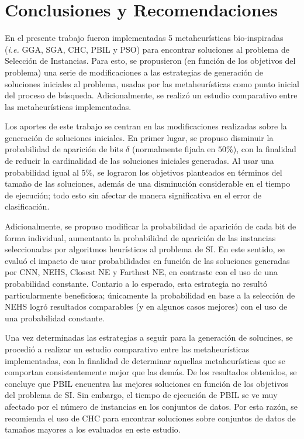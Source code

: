 \chapter*{Conclusiones y Recomendaciones}
\label{conclusiones}

En el presente trabajo fueron implementadas 5 metaheurísticas bio-inspiradas (\emph{i.e.} GGA, SGA, CHC, PBIL y PSO) para encontrar soluciones al problema de Selección de Instancias. Para esto, se propusieron (en función de los objetivos del problema) una serie de modificaciones a las estrategias de generación de soluciones iniciales al problema, usadas por las metaheurísticas como punto inicial del proceso de búsqueda. Adicionalmente, se realizó un estudio comparativo entre las metaheurísticas implementadas.%

Los aportes de este trabajo se centran en las modificaciones realizadas sobre la generación de soluciones iniciales. En primer lugar, se propuso disminuir la probabilidad de aparición de bits $\delta$ (normalmente fijada en $50\%$), con la finalidad de reducir la cardinalidad de las soluciones iniciales generadas. Al usar una probabilidad igual al $5\%$, se lograron los objetivos planteados en términos del tamaño de las soluciones, además de una disminución considerable en el tiempo de ejecución; todo esto sin afectar de manera significativa en el error de clasificación.

Adicionalmente, se propuso modificar la probabilidad de aparición de cada bit de forma individual, aumentanto la probabilidad de aparición de las instancias seleccionadas por algoritmos heurísticos al problema de SI. En este sentido, se evaluó el impacto de usar probabilidades en función de las soluciones generadas por CNN, NEHS, Closest NE y Farthest NE, en contraste con el uso de una probabilidad constante. Contario a lo esperado, esta estrategia no resultó particularmente beneficiosa; únicamente la probabilidad en base a la selección de NEHS logró resultados comparables (y en algunos casos mejores) con el uso de una probabilidad constante.

Una vez determinadas las estrategias a seguir para la generación de solucines, se procedió a realizar un estudio comparativo entre las metaheurísticas implementadas, con la finalidad de determinar aquellas metaheurísticas que se comportan consistentemente mejor que las demás. De los resultados obtenidos, se concluye que PBIL encuentra las mejores soluciones en función de los objetivos del problema de SI. Sin embargo, el tiempo de ejecución de PBIL se ve muy afectado por el número de instancias en los conjuntos de datos. Por esta razón, se recomienda el uso de CHC para encontrar soluciones sobre conjuntos de datos de tamaños mayores a los evaluados en este estudio.


